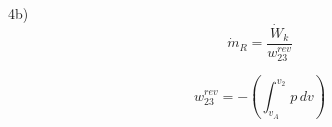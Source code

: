 4b) 
\[
\dot{m}_R = \frac{\dot{W}_k}{w_{23}^{rev}}
\]

\[
w_{23}^{rev} = - \left( \int_{v_A}^{v_2} p \, dv \right)
\]